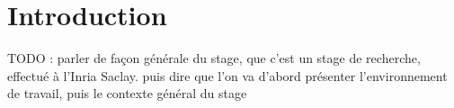 \section{Introduction}

TODO : parler de façon générale du stage, que c'est un stage de recherche, effectué à l'Inria Saclay. puis dire que l'on va d'abord présenter l'environnement de travail, puis le contexte général du stage





